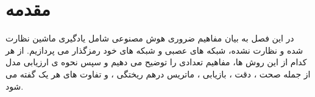 \section{مقدمه}


در این فصل به بیان مفاهیم ضروری هوش مصنوعی شامل یادگیری ماشین نظارت شده و نظارت نشده، شبکه های عصبی و شبکه های خود رمزگذار می پردازیم. از هر کدام از این روش ها، مفاهیم تعدادی را توضیح می دهیم و
سپس نحوه ی ارزیابی مدل از جمله صحت
،
دقت
،
بازیابی
،
ماتریس درهم ریختگی
،
و تفاوت های هر یک گفته می شود.

